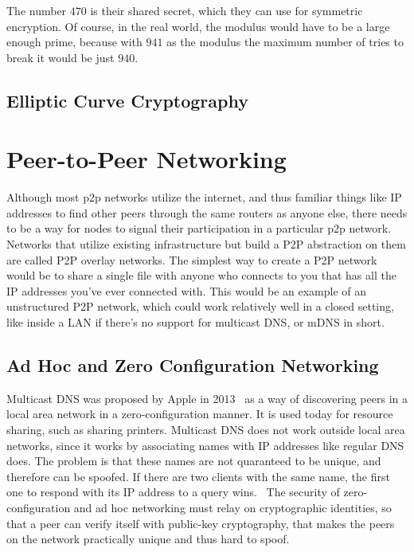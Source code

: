 The number $470$ is their shared secret, which they can use for symmetric encryption. Of course, in the real world, the modulus would have to be a large enough prime, because with $941$ as the modulus the maximum number of tries to break it would be just $940$. 

\section{Elliptic Curve Cryptography}
						
\chapter{Peer-to-Peer Networking}
\label{Peer-to-Peer Networking}
Although most p2p networks utilize the internet, and thus familiar things like IP addresses to find other peers through the same routers as anyone else, there needs to be a way for nodes to signal their participation in a particular p2p network. Networks that utilize existing infrastructure but build a P2P abstraction on them are called P2P overlay networks. The simplest way to create a P2P network would be to share a single file with anyone who connects to you that has all the IP addresses you've ever connected with. This would be an example of an unstructured P2P network, which could work relatively well in a closed setting, like inside a LAN if there's no support for multicast DNS, or mDNS in short.

\section{Ad Hoc and Zero Configuration Networking}
Multicast DNS was proposed by Apple in 2013~\cite{Cheshire2013-ja} as a way of discovering peers in a local area network in a zero-configuration manner. It is used today for resource sharing, such as sharing printers. Multicast DNS does not work outside local area networks, since it works by associating names with IP addresses like regular DNS does. The problem is that these names are not quaranteed to be unique, and therefore can be spoofed. If there are two clients with the same name, the first one to respond with its IP address to a query wins.~\cite{Pdp2008-tg} The security of zero-configuration and ad hoc networking must relay on cryptographic identities, so that a peer can verify itself with public-key cryptography, that makes the peers on the network practically unique and thus hard to spoof.

